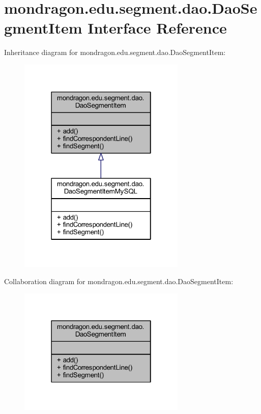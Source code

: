 \hypertarget{interfacemondragon_1_1edu_1_1segment_1_1dao_1_1_dao_segment_item}{}\section{mondragon.\+edu.\+segment.\+dao.\+Dao\+Segment\+Item Interface Reference}
\label{interfacemondragon_1_1edu_1_1segment_1_1dao_1_1_dao_segment_item}


Inheritance diagram for mondragon.\+edu.\+segment.\+dao.\+Dao\+Segment\+Item\+:\nopagebreak
\begin{figure}[H]
\begin{center}
\leavevmode
\includegraphics[width=226pt]{interfacemondragon_1_1edu_1_1segment_1_1dao_1_1_dao_segment_item__inherit__graph}
\end{center}
\end{figure}


Collaboration diagram for mondragon.\+edu.\+segment.\+dao.\+Dao\+Segment\+Item\+:\nopagebreak
\begin{figure}[H]
\begin{center}
\leavevmode
\includegraphics[width=226pt]{interfacemondragon_1_1edu_1_1segment_1_1dao_1_1_dao_segment_item__coll__graph}
\end{center}
\end{figure}
